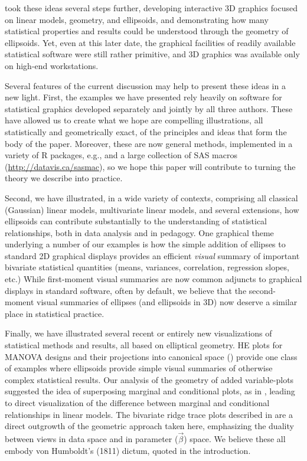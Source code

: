 \citet{Monette:90}
took these ideas several steps further, developing interactive 3D graphics focused on linear
models, geometry, and ellipsoids, and demonstrating how many statistical properties
and results could be understood through the geometry of ellipsoids.  Yet, even at this
later date, the graphical facilities of readily available statistical software were still
rather primitive, and 3D graphics was available only on high-end workstations.


Several features of the current discussion may help to present these ideas in a
new light.  First, the examples we have presented rely heavily on software for
statistical graphics developed separately and jointly by all three authors.
These have allowed us to create what we hope are compelling illustrations,
all statistically and geometrically exact, of the principles and ideas that
form the body of the paper.  Moreover, these are now general methods, implemented
in a variety of R packages, e.g.,
\citep{car,FoxWeisberg:2011,heplots1}
and a large collection of SAS macros (\url{http://datavis.ca/sasmac}),
so we hope this paper will contribute to turning the theory we describe
into practice.

Second, we have illustrated, in a wide variety of contexts,
comprising all classical (Gaussian) linear models, multivariate linear models,
and several extensions,
how ellipsoids can contribute substantially to the understanding of statistical
relationships, both in data analysis and in pedagogy.  One graphical theme underlying
a number of our examples is how the simple addition of ellipses to standard 2D graphical
displays provides an efficient \emph{visual} summary of important bivariate
statistical quantities (means, variances, correlation, regression slopes, etc.)
While first-moment visual summaries are now common adjuncts to graphical displays
in standard software, often by default, we believe that the second-moment visual summaries
of ellipses (and ellipsoids in 3D)
now deserve a similar place in statistical practice.

Finally, we have illustrated several recent or entirely new visualizations of
statistical methods and results, all based on elliptical geometry.
HE plots for MANOVA designs \citep{Friendly:07:manova}
and their projections into canonical space ()
provide one class of examples where ellipsoids provide simple visual summaries of
otherwise complex statistical results.
Our analysis of the geometry of added variable-plots suggested the idea of superposing
marginal and conditional plots, as in , leading to
direct visualization of the difference between marginal and conditional relationships
in linear models.
The bivariate ridge trace plots described in  are a direct outgrowth
of the geometric approach taken here, emphasizing the duality between views in data
space and in parameter ($\vec{\beta}$) space.
We believe these all embody von Humboldt's (1811) dictum, quoted in the introduction.






